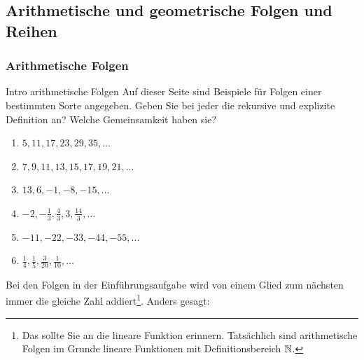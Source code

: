 












\clearpage
\subsection{Arithmetische und geometrische Folgen und Reihen}
\subsubsection{Arithmetische Folgen}

\begin{LA}{Intro arithmetische Folgen}{}
    Auf dieser Seite sind Beispiele für Folgen einer bestimmten Sorte angegeben. Geben Sie bei jeder die rekursive und explizite Definition an? Welche Gemeinsamkeit haben sie?
\begin{enumerate}
    \item $5, 11, 17, 23, 29, 35, \dots$
    \item $7, 9, 11, 13, 15, 17, 19, 21, \dots$
    \item $13, 6, -1, -8, -15,\dots$
    \item $-2, -\frac{1}{3}, \frac{4}{3}, 3, \frac{14}{3},\dots$
    \item $-11, -22, -33, -44, -55,\dots$
    \item $\frac{1}{4}, \frac{1}{5}, \frac{3}{20}, \frac{1}{10}, \dots$
\end{enumerate}
\end{LA}

\newpage


Bei den Folgen in der Einführungsaufgabe wird von einem Glied zum nächsten immer die gleiche Zahl addiert\footnote{Das sollte Sie an die lineare Funktion erinnern. Tatsächlich sind arithmetische Folgen im Grunde lineare Funktionen mit Definitionsbereich $\mathbb{N}$.}.
Anders gesagt:

